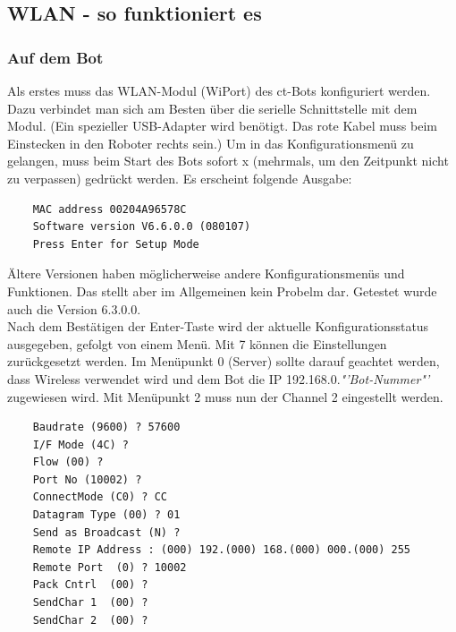 \subsection{WLAN - so funktioniert es}
\label{wlan}

\subsubsection{Auf dem Bot}
\label{wlan_auf_bot}
Als erstes muss das WLAN-Modul (WiPort) des ct-Bots konfiguriert werden.
Dazu verbindet man sich am Besten über die serielle Schnittstelle mit dem Modul.
(Ein spezieller USB-Adapter wird benötigt. Das rote Kabel muss beim 
Einstecken in den Roboter rechts sein.) Um in das Konfigurationsmenü zu gelangen,
muss beim Start des Bots sofort x (mehrmals, um den Zeitpunkt nicht zu verpassen)
gedrückt werden. Es erscheint folgende Ausgabe:
\begin{verbatim}
    MAC address 00204A96578C
    Software version V6.6.0.0 (080107) 
    Press Enter for Setup Mode
\end{verbatim}
Ältere Versionen haben möglicherweise andere Konfigurationsmenüs und Funktionen.
Das stellt aber im Allgemeinen kein Probelm dar. Getestet wurde auch die Version
6.3.0.0.\\

Nach dem Bestätigen der Enter-Taste wird der aktuelle
Konfigurationsstatus ausgegeben, gefolgt von einem Menü.
Mit 7 können die Einstellungen zurückgesetzt werden.
Im Menüpunkt 0 (Server) sollte darauf geachtet werden, dass Wireless verwendet wird
und dem Bot die IP 192.168.0.\textit{"'Bot-Nummer"'} zugewiesen wird.
Mit Menüpunkt 2 muss nun der Channel 2 eingestellt werden.
\begin{verbatim}
    Baudrate (9600) ? 57600
    I/F Mode (4C) ? 
    Flow (00) ? 
    Port No (10002) ? 
    ConnectMode (C0) ? CC
    Datagram Type (00) ? 01
    Send as Broadcast (N) ? 
    Remote IP Address : (000) 192.(000) 168.(000) 000.(000) 255
    Remote Port  (0) ? 10002
    Pack Cntrl  (00) ? 
    SendChar 1  (00) ? 
    SendChar 2  (00) ? 
\end{verbatim}

